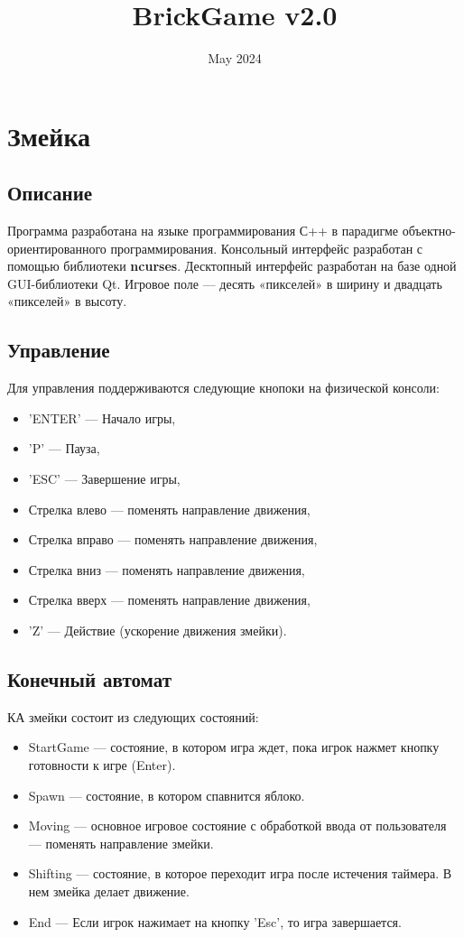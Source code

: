 \documentclass{article}
\title{BrickGame v2.0}
\date{May 2024}
\begin{document}
\maketitle
\section{Змейка}
\subsection{Описание}
Программа разработана на языке программирования С++ в парадигме объектно-ориентированного программирования. Консольный интерфейс разработан с помощью библиотеки \textbf{ncurses}. 
Десктопный интерфейс разработан на базе одной GUI-библиотеки Qt.
Игровое поле — десять «пикселей» в ширину и двадцать «пикселей» в высоту.

\subsection{Управление}
Для управления поддерживаются следующие кнопоки на физической консоли:
\begin{itemize}
    \item 'ENTER' — Начало игры,
    \item 'P' — Пауза,
    \item 'ESC' — Завершение игры,
    \item Стрелка влево — поменять направление движения,
    \item Стрелка вправо — поменять направление движения,
    \item Стрелка вниз — поменять направление движения,
    \item Стрелка вверх — поменять направление движения,
    \item 'Z' — Действие (ускорение движения змейки).

\end{itemize}

\subsection{Конечный автомат}
КА змейки состоит из следующих состояний:
\begin{itemize}
    \item StartGame — состояние, в котором игра ждет, пока игрок нажмет кнопку готовности к игре (Enter).
    \item Spawn — состояние, в котором спавнится яблоко.
    \item Moving — основное игровое состояние с обработкой ввода от пользователя — поменять направление змейки.
    \item Shifting — состояние, в которое переходит игра после истечения таймера. В нем змейка делает движение.
    \item End — Если игрок нажимает на кнопку 'Esc', то игра завершается.
\end{itemize}
\end{document}

